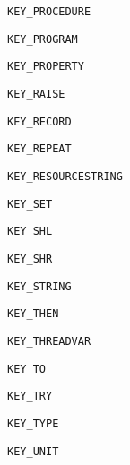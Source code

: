 \documentclass{report}
\begin{document}
\begin{list}{}
\begin{description}
\item[\texttt{KEY{\_}PROCEDURE}] \label{PasDoc_Tokenizer-KEY_PROCEDURE}
\index{}
 
\item[\texttt{KEY{\_}PROGRAM}] \label{PasDoc_Tokenizer-KEY_PROGRAM}
\index{}
 
\item[\texttt{KEY{\_}PROPERTY}] \label{PasDoc_Tokenizer-KEY_PROPERTY}
\index{}
 
\item[\texttt{KEY{\_}RAISE}] \label{PasDoc_Tokenizer-KEY_RAISE}
\index{}
 
\item[\texttt{KEY{\_}RECORD}] \label{PasDoc_Tokenizer-KEY_RECORD}
\index{}
 
\item[\texttt{KEY{\_}REPEAT}] \label{PasDoc_Tokenizer-KEY_REPEAT}
\index{}
 
\item[\texttt{KEY{\_}RESOURCESTRING}] \label{PasDoc_Tokenizer-KEY_RESOURCESTRING}
\index{}
 
\item[\texttt{KEY{\_}SET}] \label{PasDoc_Tokenizer-KEY_SET}
\index{}
 
\item[\texttt{KEY{\_}SHL}] \label{PasDoc_Tokenizer-KEY_SHL}
\index{}
 
\item[\texttt{KEY{\_}SHR}] \label{PasDoc_Tokenizer-KEY_SHR}
\index{}
 
\item[\texttt{KEY{\_}STRING}] \label{PasDoc_Tokenizer-KEY_STRING}
\index{}
 
\item[\texttt{KEY{\_}THEN}] \label{PasDoc_Tokenizer-KEY_THEN}
\index{}
 
\item[\texttt{KEY{\_}THREADVAR}] \label{PasDoc_Tokenizer-KEY_THREADVAR}
\index{}
 
\item[\texttt{KEY{\_}TO}] \label{PasDoc_Tokenizer-KEY_TO}
\index{}
 
\item[\texttt{KEY{\_}TRY}] \label{PasDoc_Tokenizer-KEY_TRY}
\index{}
 
\item[\texttt{KEY{\_}TYPE}] \label{PasDoc_Tokenizer-KEY_TYPE}
\index{}
 
\item[\texttt{KEY{\_}UNIT}] \label{PasDoc_Tokenizer-KEY_UNIT}
\index{}
 

\end{description}
\end{list}
\end{document}
